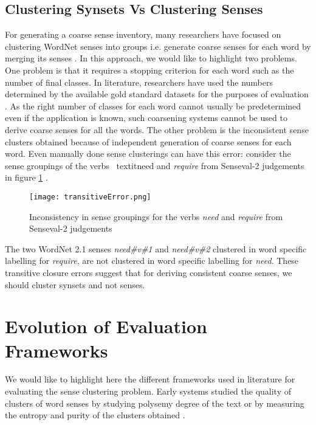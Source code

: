 \subsection{Clustering Synsets Vs Clustering Senses}
For generating a coarse sense inventory, many researchers have focused on clustering WordNet senses into groups i.e. generate coarse senses for each word by merging its senses \citep{agirre2003clustering} \citep{chklovski2003exploiting} \citep{Navigli06meaningfulclustering}. In this approach, we would like to highlight two problems. One problem is that it requires a stopping criterion for each word such as the number of final classes. In literature, researchers have used the numbers determined by the available gold standard datasets for the purposes of evaluation \citep{agirre2003clustering}. As the right number of classes for each word cannot usually be predetermined even if the application is known, such coarsening systems cannot be used to derive coarse senses for all the words. The other problem is the inconsistent sense clusters obtained because of independent generation of coarse senses for each word. Even manually done sense clusterings can have this error: consider the sense groupings of the verbs \
textit{need} and \textit{require} from Senseval-2 judgements in figure \ref{fig:transitiveError} \citep{snow07mergesense}.

\begin{figure}[h]
\begin{center}
\texttt{[image: transitiveError.png]}
\caption{Inconsistency in sense groupings for the verbs \textit{need} and \textit{require} from Senseval-2 judgements}
\label{fig:transitiveError}
\end{center}
\end{figure}

The two WordNet 2.1 senses \textit{need\#v\#1} and \textit{need\#v\#2} clustered in word specific labelling for \textit{require}, are not clustered in word specific labelling for \textit{need}. These transitive closure errors suggest that for deriving consistent coarse senses, we should cluster synsets and not senses.

\section{Evolution of Evaluation Frameworks}
We would like to highlight here the different frameworks used in literature for evaluating the sense clustering problem. Early systems studied the quality of clusters of word senses by studying polysemy degree of the text \citep{Mihalcea01ez.wordnet:principles} or by measuring the entropy and purity of the clusters obtained \citep{agirre2003clustering}.

